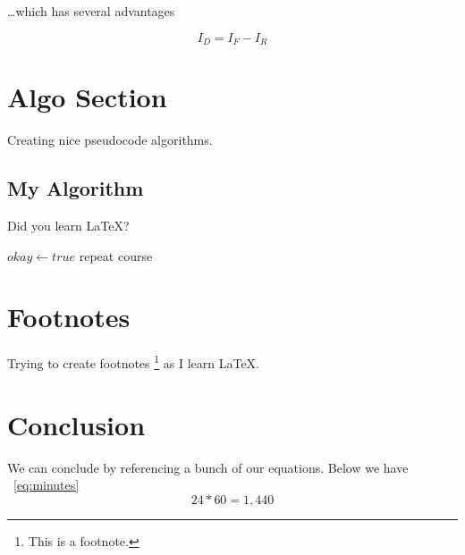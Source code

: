 \documentclass{article}
\begin{document}
\ldots which has several advantages

\begin{equation}
I_D = I_F - I_R
\end{equation}

\section{Algo Section}

Creating nice pseudocode algorithms.

\subsection{My Algorithm}

Did you learn \LaTeX?

\begin{algorithmic}
	\State $okay \gets true$
\Else
		\State repeat course
	\EndWhile
\EndIf
\end{algorithmic}

\section{Footnotes}
Trying to create footnotes \footnote{This is a footnote.} as I learn \LaTeX.

\section{Conclusion}
We can conclude by referencing a bunch of our equations. Below we have ~\ref{eq:minutes}
\begin{equation}
24 * 60 = 1,440 
\label{eq:minutes}
\end{equation}
\end{document}

